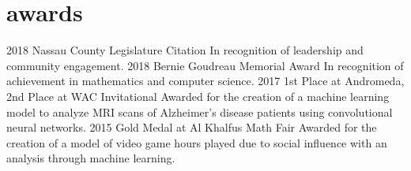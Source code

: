 \documentclass[]{friggeri-cv}
\begin{document}
\section{awards}
\begin{entrylist}
    \entry
    {2018}
    {Nassau County Legislature Citation}
    {}
    {In recognition of leadership and community engagement.} 
    \entry
    {2018}
    {Bernie Goudreau Memorial Award}
    {}
    {In recognition of achievement in mathematics and computer science.}
    \entry
    {2017}
    {1st Place at Andromeda, 2nd Place at WAC Invitational}
    {}
    {Awarded for the creation of a machine learning model to analyze MRI scans of Alzheimer’s disease patients using convolutional neural networks.}
    \entry
    {2015}
    {Gold Medal at Al Khalfus Math Fair}
    {}
    {Awarded for the creation of a
    model of video game hours played due to social influence with an analysis through machine learning.}
\end{entrylist}
\end{document}
